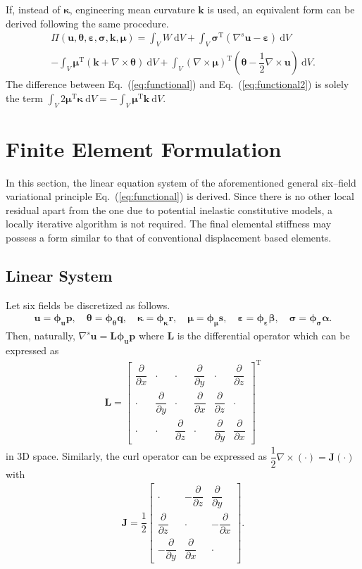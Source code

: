\documentclass[3p,sort&compress,11pt,fleqn,review]{elsarticle}
\newcommand*{\eqsref}[1]{Eq.~(\ref{#1})}
\newcommand*{\mb}[1]{\boldsymbol{#1}}
\newcommand*{\mT}{\mathrm{T}}
\newcommand*{\md}[1]{\mathrm{d}#1}
\newcommand*{\pfrac}[2]{\dfrac{\partial#1}{\partial#2}}
\begin{document}
If, instead of $\mb{\kappa}$, engineering mean curvature $\mb{k}$ is used, an equivalent form can be derived following the same procedure.
\begin{multline}\label{eq:functional2}
\varPi\left(\mb{u},\mb{\theta},\mb{\varepsilon},\mb{\sigma},\mb{k},\mb{\mu}\right)=\int_VW~\md{V}
+\int_V\mb{\sigma}^\mT\left(\nabla^s\mb{u}-\mb{\varepsilon}\right)~\md{V}\\
-\int_V\mb{\mu}^\mT\left(\mb{k}+\nabla\times\mb{\theta}\right)~\md{V}
+\int_V\left(\nabla\times\mb{\mu}\right)^\mT\left(\mb{\theta}-\dfrac{1}{2}\nabla\times\mb{u}\right)~\md{V}.
\end{multline}
The difference between \eqsref{eq:functional} and \eqsref{eq:functional2} is solely the term $\displaystyle\int_V2\mb{\mu}^\mT\mb{\kappa}~\md{V}=-\int_V\mb{\mu}^\mT\mb{k}~\md{V}$.
\section{Finite Element Formulation}
In this section, the linear equation system of the aforementioned general six--field variational principle \eqsref{eq:functional} is derived. Since there is no other local residual apart from the one due to potential inelastic constitutive models, a locally iterative algorithm is not required. The final elemental stiffness may possess a form similar to that of conventional displacement based elements.
\subsection{Linear System}
Let six fields be discretized as follows.
\begin{gather}
\mb{u}=\mb{\phi}_{\mb{u}}\mb{p},\quad
\mb{\theta}=\mb{\phi}_{\mb{\theta}}\mb{q},\quad
\mb{\kappa}=\mb{\phi}_{\mb{\kappa}}\mb{r},\quad
\mb{\mu}=\mb{\phi}_{\mb{\mu}}\mb{s},\quad
\mb{\varepsilon}=\mb{\phi}_{\mb{\varepsilon}}\mb{\beta},\quad
\mb{\sigma}=\mb{\phi}_{\mb{\sigma}}\mb{\alpha}.
\end{gather}
Then, naturally, $\nabla^s\mb{u}=\mb{L}\mb{\phi}_{\mb{u}}\mb{p}$ where $\mb{L}$ is the differential operator which can be expressed as
\begin{gather}
\mb{L}=\begin{bmatrix}
\pfrac{}{x}&\cdot&\cdot&\pfrac{}{y}&\cdot&\pfrac{}{z}\\[4mm]
\cdot&\pfrac{}{y}&\cdot&\pfrac{}{x}&\pfrac{}{z}&\cdot\\[4mm]
\cdot&\cdot&\pfrac{}{z}&\cdot&\pfrac{}{y}&\pfrac{}{x}
\end{bmatrix}^\mT
\end{gather}
in 3D space. Similarly, the curl operator can be expressed as $\dfrac{1}{2}\nabla\times\left(\cdot\right)=\mb{J}\left(\cdot\right)$ with
\begin{gather}
\mb{J}=\dfrac{1}{2}\begin{bmatrix}
\cdot&-\pfrac{}{z}&\pfrac{}{y}\\[4mm]
\pfrac{}{z}&\cdot&-\pfrac{}{x}\\[4mm]
-\pfrac{}{y}&\pfrac{}{x}&\cdot
\end{bmatrix}.
\end{gather}
\end{document}
